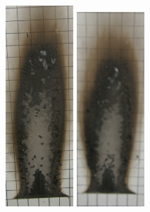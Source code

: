 \documentclass[twoside]{uocthesis}
\begin{document}
\begin{figure}[p]
	\includegraphics[width=1.0in]{../Figures/GBNG4_P5120086}
	\includegraphics[width=1.0in]{../Figures/GBNG5_P5120137} \\


\end{figure}
\end{document}
